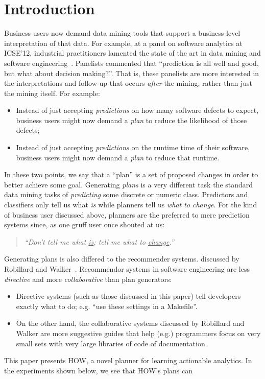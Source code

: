 \documentclass[conference]{IEEEtran}
\newcommand{\bi}{\begin{itemize}}
\newcommand{\ei}{\end{itemize}}
\begin{document}
\section{Introduction}
Business  users   now demand   data mining tools
that  support a  business-level
interpretation of that data. For example,
at a  panel on software analytics at ICSE'12,
industrial practitioners lamented the state of the art in data mining
and software engineering~\cite{menzies12a}. Panelists commented that
``prediction is all well and good, but what about decision
making?''. That is, these panelists are more interested in the interpretations
and follow-up
that occurs {\em after} the mining, rather than just  the mining itself. For example:
\bi
\item Instead of just accepting  {\em predictions} on how many 
 software defects
to expect,  business users might now demand a {\em plan} to
reduce the likelihood of those defects;
\item Instead of just accepting {\em predictions} on the runtime
time of their software, business users might now demand
a {\em plan} to reduce that runtime.
\ei
In these two points, we say that a ``plan'' is a  set of proposed changes in order to better achieve some goal. 
Generating {\em plans} is a  very different task the standard
data mining tasks of {\em predicting} some discrete or numeric class.
Predictors
and classifiers only tell us what {\em is} while planners 
  tell us {\em what to change}. For the kind of business user
discussed above, planners are the preferred to mere prediction systems
since, as one gruff user once shouted at us:
\begin{quote}
{\em ``Don't tell me what \underline{is};
tell me what to \underline{change}.''}
\end{quote}
Generating plans is also differed to the recommender systems. 
discussed by Robillard and Walker~\cite{rob14}.  Recommendor systems
in software engineering
are less {\em directive} and more    {\em collaborative} than plan generators:
\bi
\item
Directive systems (such as those discussed in this paper) tell developers exactly what to do;
e.g. ``use these settings in a Makefile''. 
\item
On the other hand, the collaborative systems discussed by Robillard and Walker
are more suggestive guides that
help (e.g.) programmers focus on very small sets
with  very large libraries of code of documentation.
\ei
This paper presents HOW, a novel planner for learning actionable analytics.
In the experiments shown below, we see that HOW's plans can
\end{document}
